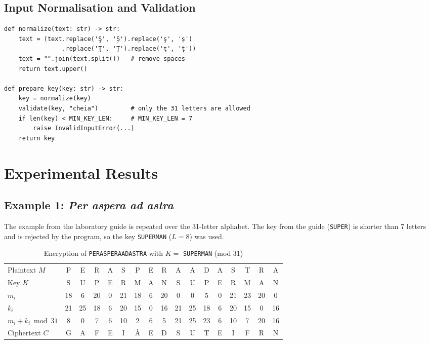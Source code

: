\documentclass[12pt,a4paper]{article}
\begin{document}
\subsection{Input Normalisation and Validation}
\begin{lstlisting}[style=py, caption={Normalisation and validation of the input}]
def normalize(text: str) -> str:
    text = (text.replace('Ş', 'Ș').replace('ş', 'ș')
                .replace('Ţ', 'Ț').replace('ţ', 'ț'))
    text = "".join(text.split())   # remove spaces
    return text.upper()

def prepare_key(key: str) -> str:
    key = normalize(key)
    validate(key, "cheia")         # only the 31 letters are allowed
    if len(key) < MIN_KEY_LEN:     # MIN_KEY_LEN = 7
        raise InvalidInputError(...)
    return key
\end{lstlisting}

\section{Experimental Results}
\subsection{Example 1: \textit{Per aspera ad astra}}
The example from the laboratory guide is repeated over the 31-letter alphabet. The key from the
guide (\texttt{SUPER}) is shorter than 7 letters and is rejected by the program, so the key
\texttt{SUPERMAN} ($L=8$) was used.

\begin{table}[H]
\centering
\caption{Encryption of \texttt{PERASPERAADASTRA} with $K=$ \texttt{SUPERMAN} (mod 31)}
\small
\setlength{\tabcolsep}{3.5pt}
\begin{tabular}{l*{16}{c}}
\toprule
Plaintext $M$ & P & E & R & A & S & P & E & R & A & A & D & A & S & T & R & A \\
Key $K$       & S & U & P & E & R & M & A & N & S & U & P & E & R & M & A & N \\
\midrule
$m_i$         & 18 & 6 & 20 & 0 & 21 & 18 & 6 & 20 & 0 & 0 & 5 & 0 & 21 & 23 & 20 & 0 \\
$k_i$         & 21 & 25 & 18 & 6 & 20 & 15 & 0 & 16 & 21 & 25 & 18 & 6 & 20 & 15 & 0 & 16 \\
$m_i+k_i \bmod 31$ & 8 & 0 & 7 & 6 & 10 & 2 & 6 & 5 & 21 & 25 & 23 & 6 & 10 & 7 & 20 & 16 \\
\midrule
Ciphertext $C$ & G & A & F & E & I & Â & E & D & S & U & T & E & I & F & R & N \\
\bottomrule
\end{tabular}
\end{table}
\end{document}

